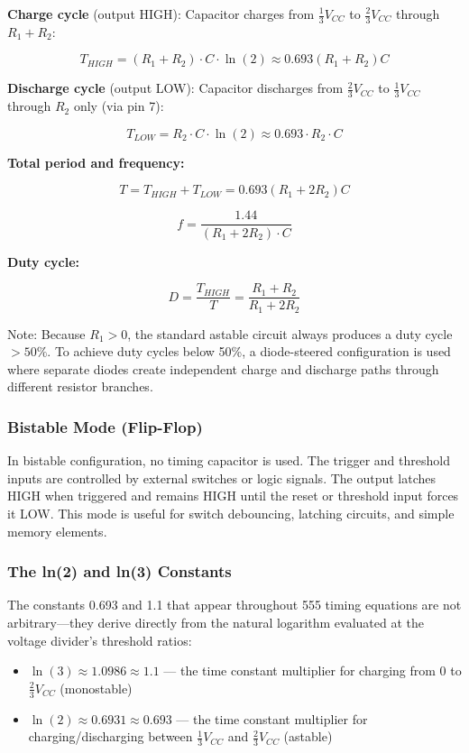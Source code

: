 \documentclass[11pt,letterpaper]{article}
\begin{document}
\textbf{Charge cycle} (output HIGH): Capacitor charges from $\frac{1}{3}V_{CC}$ to $\frac{2}{3}V_{CC}$ through $R_1 + R_2$:

$$T_{HIGH} = (R_1 + R_2) \cdot C \cdot \ln(2) \approx 0.693(R_1 + R_2)C$$

\textbf{Discharge cycle} (output LOW): Capacitor discharges from $\frac{2}{3}V_{CC}$ to $\frac{1}{3}V_{CC}$ through $R_2$ only (via pin 7):

$$T_{LOW} = R_2 \cdot C \cdot \ln(2) \approx 0.693 \cdot R_2 \cdot C$$

\textbf{Total period and frequency:}

$$T = T_{HIGH} + T_{LOW} = 0.693(R_1 + 2R_2)C$$

$$\boxed{f = \frac{1.44}{(R_1 + 2R_2) \cdot C}}$$

\textbf{Duty cycle:}

$$D = \frac{T_{HIGH}}{T} = \frac{R_1 + R_2}{R_1 + 2R_2}$$

Note: Because $R_1 > 0$, the standard astable circuit always produces a duty cycle $> 50\%$. To achieve duty cycles below 50\%, a diode-steered configuration is used where separate diodes create independent charge and discharge paths through different resistor branches.

\subsubsection{Bistable Mode (Flip-Flop)}

In bistable configuration, no timing capacitor is used. The trigger and threshold inputs are controlled by external switches or logic signals. The output latches HIGH when triggered and remains HIGH until the reset or threshold input forces it LOW. This mode is useful for switch debouncing, latching circuits, and simple memory elements.

\subsubsection{The ln(2) and ln(3) Constants}

The constants 0.693 and 1.1 that appear throughout 555 timing equations are not arbitrary---they derive directly from the natural logarithm evaluated at the voltage divider's threshold ratios:

\begin{itemize}[leftmargin=2em]
  \item $\ln(3) \approx 1.0986 \approx 1.1$ --- the time constant multiplier for charging from 0 to $\frac{2}{3}V_{CC}$ (monostable)
  \item $\ln(2) \approx 0.6931 \approx 0.693$ --- the time constant multiplier for charging/discharging between $\frac{1}{3}V_{CC}$ and $\frac{2}{3}V_{CC}$ (astable)
\end{itemize}
\end{document}
